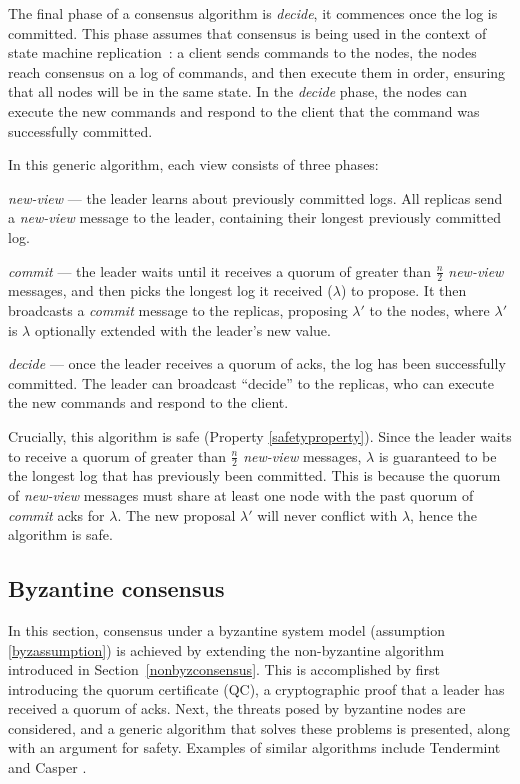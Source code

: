 The final phase of a consensus algorithm is \textit{decide}, it commences once the log is committed. This phase assumes that consensus is being used in the context of state machine \mbox{replication \cite{lamportTimeClocksOrdering1978,schneiderImplementingFaulttolerantServices1990}}: a client sends commands to the nodes, the nodes reach consensus on a log of commands, and then execute them in order, ensuring that all nodes will be in the same state. In the \textit{decide} phase, the nodes can execute the new commands and respond to the client that the command was successfully committed.

In this generic algorithm, each view consists of three phases:

\begin{description}
	\item \textit{new-view} --- the leader learns about previously committed logs. All replicas send a \textit{new-view} message to the leader, containing their longest previously committed log.
	\item \textit{commit} --- the leader waits until it receives a quorum of greater than $\frac{n}{2}$ \textit{new-view} messages, and then picks the longest log it received ($\lambda$) to propose. It then broadcasts a \textit{commit} message to the replicas, proposing $\lambda'$ to the nodes, where $\lambda'$ is $\lambda$ optionally extended with the leader's new value.
	\item \textit{decide} --- once the leader receives a quorum of acks, the log has been successfully committed. The leader can broadcast ``decide'' to the replicas, who can execute the new commands and respond to the client.
\end{description}

Crucially, this algorithm is safe (Property \ref{safetyproperty}). Since the leader waits to receive a quorum of greater than $\frac{n}{2}$ \textit{new-view} messages, $\lambda$ is guaranteed to be the longest log that has previously been committed. This is because the quorum of \textit{new-view} messages must share at least one node with the past quorum of \textit{commit} acks for $\lambda$. The new proposal $\lambda'$ will never conflict with $\lambda$, hence the algorithm is safe.

\subsection{Byzantine consensus} \label{byzconsensus}
In this section, consensus under a byzantine system model (assumption \ref{byzassumption}) is achieved by extending the non-byzantine algorithm introduced in Section~\ref{nonbyzconsensus}. This is accomplished by first introducing the quorum certificate (QC), a cryptographic proof that a leader has received a quorum of acks. Next, the threats posed by byzantine nodes are considered, and a generic algorithm that solves these problems is presented, along with an argument for safety. Examples of similar algorithms include Tendermint \cite{kwonTendermintConsensusMining2014} and Casper \cite{buterinCasperFriendlyFinality2019}.

